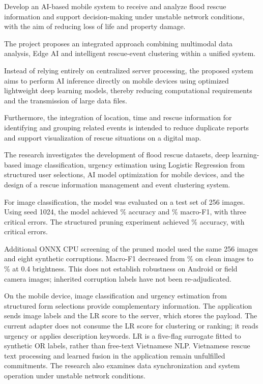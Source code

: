 
Develop an AI-based mobile system to receive and analyze flood rescue information and support decision-making under unstable network conditions, with the aim of reducing loss of life and property damage.

The project proposes an integrated approach combining multimodal data analysis, Edge AI and intelligent rescue-event clustering within a unified system.

Instead of relying entirely on centralized server processing, the proposed system aims to perform AI inference directly on mobile devices using optimized lightweight deep learning models, thereby reducing computational requirements and the transmission of large data files.

Furthermore, the integration of location, time and rescue information for identifying and grouping related events is intended to reduce duplicate reports and support visualization of rescue situations on a digital map.

The research investigates the development of flood rescue datasets, deep learning-based image classification, urgency estimation using Logistic Regression from structured user selections, AI model optimization for mobile devices, and the design of a rescue information management and event clustering system.

For image classification, the model was evaluated on a test set of 256 images. Using seed 1024, the model achieved \NewImageAccuracy\% accuracy and \NewImageMacroFOne\% macro-F1, with three critical errors. The structured pruning experiment achieved \PruningAccuracy\% accuracy, with \PruningCriticalCount{} critical errors.

Additional ONNX CPU screening of the pruned model used the same 256 images and eight synthetic corruptions. Macro-F1 decreased from \QualityCleanMacroFOne\% on clean images to \QualityDarkMacroFOne\% at 0.4 brightness. This does not establish robustness on Android or field camera images; inherited corruption labels have not been re-adjudicated.

On the mobile device, image classification and urgency estimation from structured form selections provide complementary information. The application sends image labels and the LR score to the server, which stores the payload. The current adapter does not consume the LR score for clustering or ranking; it reads urgency or applies description keywords. LR is a five-flag surrogate fitted to synthetic OR labels, rather than free-text Vietnamese NLP. Vietnamese rescue text processing and learned fusion in the application remain unfulfilled commitments. The research also examines data synchronization and system operation under unstable network conditions.


